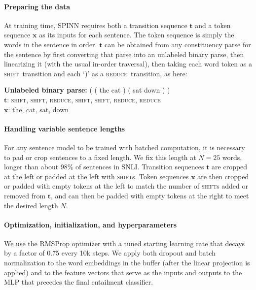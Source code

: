 \documentclass[11pt]{article}
\newcommand{\shift}{\textsc{shift}}
\newcommand{\reduce}{\textsc{reduce}}
\begin{document}
\paragraph{Preparing the data} At training time, SPINN requires both a transition sequence $\mathbf t$  and a token sequence $\mathbf x$ as its inputs for each sentence. The token sequence is simply the words in the sentence in order. $\mathbf t$ can be obtained from any constituency parse for the sentence by first converting that parse into an unlabeled binary parse, then linearizing it (with the usual in-order traversal), then taking each word token as a \shift~transition and each `)' as a \reduce~transition, as here:

\vspace{0.5em}
{\noindent\small
{\bf Unlabeled binary parse:} ( ( the cat ) ( sat down ) )\\
{$\mathbf t$}: \shift, \shift, \reduce, \shift, \shift, \reduce, \reduce\\
{$\mathbf x$}: the, cat, sat, down
}

\paragraph{Handling variable sentence lengths} For any sentence model to be trained with batched computation, it is necessary to pad or crop sentences to a fixed length. We fix this length at $N = 25$ words, longer than about 98\% of sentences in SNLI. Transition sequences $\mathbf t$ are cropped at the left or padded at the left with \shift s. Token sequences $\mathbf x$ are then cropped or padded with empty tokens at the left to match the number of \shift s added or removed from $\mathbf t$, and can then be padded with empty tokens at the right to meet the desired length $N$.

\paragraph{Optimization, initialization, and hyperparameters}

We use the RMSProp optimizer \citep{tieleman2012lecture} with a tuned starting learning rate that decays by a factor of 0.75 every 10k steps. We apply both dropout \citep{srivastava2014dropout} and batch normalization \citep{2015SIoffeCSzegedy} to the word embeddings in the buffer (after the linear projection is applied) and to the feature vectors that serve as the inputs and outputs to the MLP that precedes the final entailment classifier.
\end{document}
